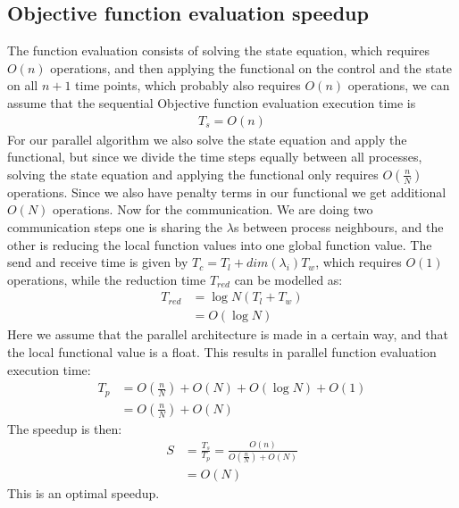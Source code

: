 \subsection{Objective function evaluation speedup}
The function evaluation consists of solving the state equation, which requires $O(n)$ operations, and then applying the functional on the control and the state on all $n+1$ time points, which probably also requires $O(n)$ operations, we can assume that the sequential Objective function evaluation execution time is 
\begin{align*}
T_s = O(n)
\end{align*}
For our parallel algorithm we also solve the state equation and apply the functional, but since we divide the time steps equally between all processes, solving the state equation and applying the functional only requires $O(\frac{n}{N})$ operations. Since we also have penalty terms in our functional we get additional $O(N)$ operations. Now for the communication. We are doing two communication steps one is sharing the $\lambda$s between process neighbours, and the other is reducing the local function values into one global function value. The send and receive time is given by $T_c = T_l + \textit{dim}(\lambda_i)T_w$, which requires $O(1)$ operations, while the reduction time $T_{red}$ can be modelled as:
\begin{align*}
T_{red} &= \log N (T_l+T_w) \\
&= O(\log N)
\end{align*} 
Here we assume that the parallel architecture is made in a certain way, and that the local functional value is a float. This results in parallel function evaluation execution time:
\begin{align*}
T_p &= O(\frac{n}{N}) +O(N) + O(\log N) + O(1) \\
&=O(\frac{n}{N}) +O(N)
\end{align*}
The speedup is then:
\begin{align*}
S &= \frac{T_s}{T_p} = \frac{O(n)}{O(\frac{n}{N}) +O(N)} \\
&=O(N)
\end{align*}
This is an optimal speedup.
